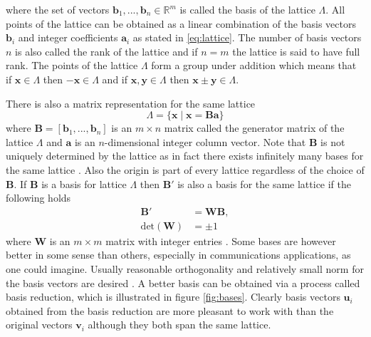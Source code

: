 \documentclass[english,12pt,a4paper,pdftex,sci,utf8]{aaltothesis}
\begin{document}
\noindent where the set of vectors $\mathbf{b}_1, ... , \mathbf{b}_n \in \mathbb{R}^m$ is called the basis of the lattice $\Lambda$. All points of the lattice can be obtained as a linear combination of the basis vectors $\mathbf{b}_i$ and integer coefficients $\mathbf{a}_i$ as stated in \eqref{eq:lattice}. The number of basis vectors $n$ is also called the rank of the lattice and if $n = m$ the lattice is said to have full rank. The points of the lattice $\Lambda$ form a group under addition which means that if $\mathbf{x} \in \Lambda$ then $-\mathbf{x} \in \Lambda$ and if $\mathbf{x}, \mathbf{y} \in \Lambda$ then $\mathbf{x} \pm \mathbf{y} \in \Lambda$. \cite{cassels}
\par There is also a matrix representation for the same lattice
\begin{equation}
\Lambda = \{\mathbf{x}\mid\mathbf{x} = \mathbf{B}\mathbf{a} \} \label{eq:matrix}
\end{equation}
where $\mathbf{B} = [\mathbf{b}_1, ... , \mathbf{b}_n]$ is an $m \times n$ matrix called the generator matrix of the lattice $\Lambda$ and $\mathbf{a}$ is an $n$-dimensional integer column vector. Note that $\mathbf{B}$ is not uniquely determined by the lattice as in fact there exists infinitely many bases for the same lattice \cite{cassels}. Also the origin is part of every lattice regardless of the choice of $\mathbf{B}$. If $\mathbf{B}$ is a basis for lattice $\Lambda$ then $\mathbf{B}'$ is also a basis for the same lattice if the following holds
\begin{align}
\mathbf{B}' &= \mathbf{W}\mathbf{B}, \\
\text{det}(\mathbf{W}) &= \pm 1
\label{eq:basis_change}
\end{align}
where $\mathbf{W}$ is an $m \times m$ matrix with integer entries \cite{agrell}. Some bases are however better in some sense than others, especially in communications applications, as one could imagine. Usually reasonable orthogonality and relatively small norm for the basis vectors are desired \cite{agrell}. A better basis can be obtained via a process called basis reduction, which is illustrated in figure \ref{fig:bases}. Clearly basis vectors $\mathbf{u}_i$ obtained from the basis reduction are more pleasant to work with than the original vectors $\mathbf{v}_i$ although they both span the same lattice.
\end{document}
